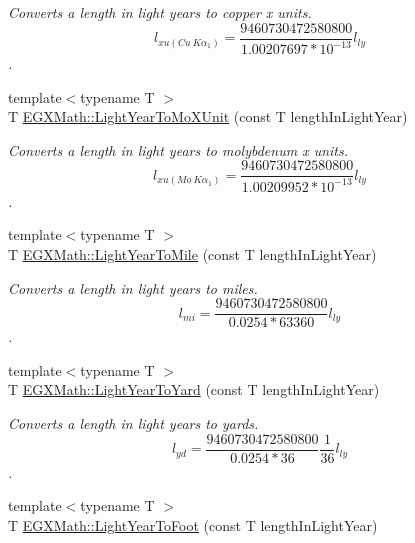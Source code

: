 \begin{DoxyCompactItemize}
\begin{DoxyCompactList}\small\item\em Converts a length in light years to copper x units. \[ l_{xu(Cu\ K\alpha_1)}= \frac{9460730472580800}{1.00207697*10^{-13}} l_{ly}\]. \end{DoxyCompactList}\item 
{\footnotesize template$<$typename T $>$ }\\T \mbox{\hyperlink{group___e_g_x_math-_conversions-_length_conversions-_astronomical-_light_year-_non-_s_i_gac275191181b93d118ec2b21cf09ff356}{E\+G\+X\+Math\+::\+Light\+Year\+To\+Mo\+X\+Unit}} (const T length\+In\+Light\+Year)
\begin{DoxyCompactList}\small\item\em Converts a length in light years to molybdenum x units. \[ l_{xu(Mo\ K\alpha_1)}=\frac{9460730472580800}{1.00209952*10^{-13}} l_{ly}\]. \end{DoxyCompactList}\item 
{\footnotesize template$<$typename T $>$ }\\T \mbox{\hyperlink{group___e_g_x_math-_conversions-_length_conversions-_astronomical-_light_year-_imperial_ga3f6a914c8896334f1be6425107a34827}{E\+G\+X\+Math\+::\+Light\+Year\+To\+Mile}} (const T length\+In\+Light\+Year)
\begin{DoxyCompactList}\small\item\em Converts a length in light years to miles. \[ l_{mi}=\frac{9460730472580800}{0.0254 * 63360} l_{ly} \]. \end{DoxyCompactList}\item 
{\footnotesize template$<$typename T $>$ }\\T \mbox{\hyperlink{group___e_g_x_math-_conversions-_length_conversions-_astronomical-_light_year-_imperial_ga78ce9f584c98c3ad8c4daaebb76030d3}{E\+G\+X\+Math\+::\+Light\+Year\+To\+Yard}} (const T length\+In\+Light\+Year)
\begin{DoxyCompactList}\small\item\em Converts a length in light years to yards. \[ l_{yd}= \frac{9460730472580800}{0.0254 * 36} \frac{1}{36} l_{ly} \]. \end{DoxyCompactList}\item 
{\footnotesize template$<$typename T $>$ }\\T \mbox{\hyperlink{group___e_g_x_math-_conversions-_length_conversions-_astronomical-_light_year-_imperial_gac1d171820f3a01eac5bcb514932a3a17}{E\+G\+X\+Math\+::\+Light\+Year\+To\+Foot}} (const T length\+In\+Light\+Year)

\end{DoxyCompactItemize}
